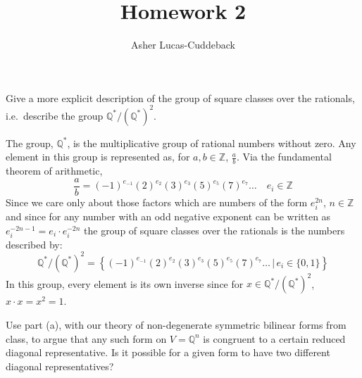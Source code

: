 \documentclass[11pt]{article}
\title{Homework 2}
\author{Asher Lucas-Cuddeback}
\newcommand{\Q}{\mathbb{Q}}
\newcommand{\Z}{\mathbb{Z}}
\begin{document}
\maketitle
\setcounter{problemcounter}{2}
\begin{problem}
  \begin{parts}

  \item Give a more explicit description of the group of square classes over
    the rationals, i.e.\ describe the group $\mathbb{Q}^*/(\mathbb{Q}^*)^2$.

    \begin{solution}
      The group, \( \Q^* \), is the multiplicative group of rational
      numbers without zero. Any element in this group is represented
      as, for \( a,b\in\Z \), \( \frac{a}{b} \). Via the fundamental
      theorem of arithmetic,
      \[
        \frac{a}{b}=(-1)^{e_{-1}}(2)^{e_2}(3)^{e_3}(5)^{e_5}(7)^{e_7}\dots\quad
        e_i\in\Z
      \]
      Since we care only about those factors which are numbers of the
      form \( e_i^{2n} \), \( n\in\Z \) and since for any number with
      an odd negative exponent can be written as \( e_i^{-2n-1} =
      e_i\cdot e_i^{-2n} \) the group of square classes over the
      rationals is the numbers described by:
      \[
        \Q^* / (\Q^*)^2=
        \left\{(-1)^{e_{-1}}(2)^{e_2}(3)^{e_3}(5)^{e_5}(7)^{e_7}\dots\,|\,
        e_i\in\{0, 1\}\right\}
      \]
      In this group, every element is its own inverse since for \(
      x\in\Q^*/(\Q^*)^2 \), \( x\cdot x = x^2 = 1 \).
    \end{solution}
    \newpage
  \item Use part (a), with our theory of non-degenerate symmetric bilinear
    forms from class, to argue that any such form on $V = \mathbb{Q}^n$ is
    congruent to a certain reduced diagonal representative. Is it
    possible for a
    given form to have two different diagonal representatives?


\end{parts}
\end{problem}
\end{document}
